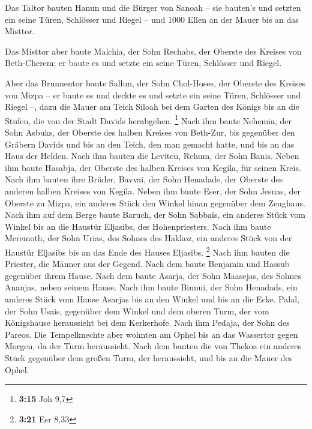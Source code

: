  Das Taltor bauten Hanun und die Bürger von Sanoah -- sie
bauten's und setzten ein seine Türen, Schlösser und Riegel -- und 1000
Ellen an der Mauer bis an das Misttor.

 Das Misttor aber baute Malchia, der Sohn Rechabs, der
Oberste des Kreises von Beth-Cherem; er baute es und setzte ein seine
Türen, Schlösser und Riegel.

 Aber das Brunnentor baute Sallun, der Sohn Chol-Hoses,
der Oberste des Kreises von Mizpa -- er baute es und deckte es und
setzte ein seine Türen, Schlösser und Riegel --, dazu die Mauer am Teich
Siloah bei dem Garten des Königs bis an die Stufen, die von der Stadt
Davids herabgehen. \footnote{\textbf{3:15} Joh 9,7}  Nach
ihm baute Nehemia, der Sohn Asbuks, der Oberste des halben Kreises von
Beth-Zur, bis gegenüber den Gräbern Davids und bis an den Teich, den man
gemacht hatte, und bis an das Haus der Helden.  Nach ihm
bauten die Leviten, Rehum, der Sohn Banis. Neben ihm baute Hasabja, der
Oberste des halben Kreises von Kegila, für seinen Kreis. 
Nach ihm bauten ihre Brüder, Bavvai, der Sohn Henadads, der Oberste des
anderen halben Kreises von Kegila.  Neben ihm baute Eser,
der Sohn Jesuas, der Oberste zu Mizpa, ein anderes Stück den Winkel
hinan gegenüber dem Zeughaus.  Nach ihm auf dem Berge
baute Baruch, der Sohn Sabbais, ein anderes Stück vom Winkel bis an die
Haustür Eljasibs, des Hohenpriesters.  Nach ihm baute
Meremoth, der Sohn Urias, des Sohnes des Hakkoz, ein anderes Stück von
der Haustür Eljasibs bis an das Ende des Hauses Eljasibs. \footnote{\textbf{3:21}
  Esr 8,33}  Nach ihm bauten die Priester, die Männer aus
der Gegend.  Nach dem baute Benjamin und Hassub gegenüber
ihrem Hause. Nach dem baute Asarja, der Sohn Maasejas, des Sohnes
Ananjas, neben seinem Hause.  Nach ihm baute Binnui, der
Sohn Henadads, ein anderes Stück vom Hause Asarjas bis an den Winkel und
bis an die Ecke.  Palal, der Sohn Usais, gegenüber dem
Winkel und dem oberen Turm, der vom Königshause heraussieht bei dem
Kerkerhofe. Nach ihm Pedaja, der Sohn des Pareos.  Die
Tempelknechte aber wohnten am Ophel bis an das Wassertor gegen Morgen,
da der Turm heraussieht.  Nach dem bauten die von Thekoa
ein anderes Stück gegenüber dem großen Turm, der heraussieht, und bis an
die Mauer des Ophel.

